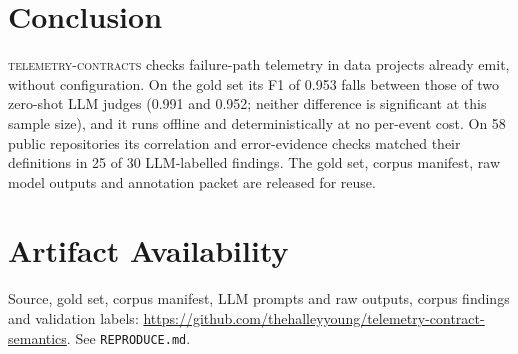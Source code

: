 \documentclass[conference]{IEEEtran}
\newcommand{\tool}{\textsc{telemetry-contracts}\xspace}
\begin{document}
\section{Conclusion}

\tool checks failure-path telemetry in data projects already emit, without configuration. On the gold set its F1 of 0.953 falls between those of two zero-shot LLM judges (0.991 and 0.952; neither difference is significant at this sample size), and it runs offline and deterministically at no per-event cost. On 58 public repositories its correlation and error-evidence checks matched their definitions in 25 of 30 LLM-labelled findings. The gold set, corpus manifest, raw model outputs and annotation packet are released for reuse.

\section*{Artifact Availability}

Source, gold set, corpus manifest, LLM prompts and raw outputs, corpus findings and validation labels: \url{https://github.com/thehalleyyoung/telemetry-contract-semantics}. See \texttt{REPRODUCE.md}.



\end{document}
